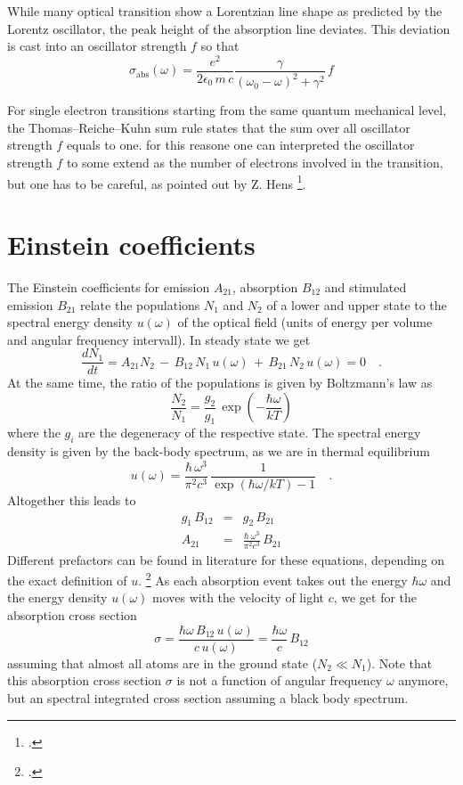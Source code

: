 While many optical transition show a Lorentzian line shape as predicted by the Lorentz oscillator, the peak height of the absorption line deviates. This deviation is cast into an oscillator strength $f$ so that 
\[
 \sigma_{\text{abs}}(\omega) =   \frac{e^2  }{2 \epsilon_0 \,  m \, c}  \frac{\gamma  }{(\omega_0 - \omega)^2 +  \gamma ^2}  \, f
\]

For single electron transitions starting from the same quantum mechanical level, the Thomas–Reiche–Kuhn sum rule states that the sum over all oscillator strength $f$ equals to one. for this reasone one can interpreted the oscillator strength  $f$  to some extend  as the number of electrons involved in  the transition, but one has to be careful, as pointed out by Z. Hens \footcite{Hens:2008kr}.

\section{Einstein coefficients}

The Einstein coefficients for emission $A_{21}$, absorption $B_{12}$ and stimulated emission $B_{21}$ relate the populations $N_1$ and $N_2$ of a lower and upper state to the spectral energy density $u(\omega)$ of the optical field (units of energy per volume and angular frequency intervall). In steady state we get
\[
 \frac{d N_1}{dt} =  A_{21} N_2 \, - \, B_{12} \, N_1 \, u(\omega) \, + \, B_{21}\, N_2 \,u(\omega)  = 0 \quad .
\]
At the same time, the ratio of the populations is given by Boltzmann's law as
\[
 \frac{N_2}{N_1} = \frac{g_2}{g_1} \, \exp \left( - \frac{\hbar \omega}{kT} \right)
\]
where the $g_i$ are the degeneracy of the respective state. The spectral energy density is given by the back-body spectrum, as we are in thermal equilibrium
\[
 u(\omega) = \frac{\hbar \, \omega^3}{\pi^2 c^3} \, \frac{1}{\exp \left( \hbar \omega / kT \right) - 1} \quad .
\]
Altogether this leads to 
\begin{eqnarray*}
 g_1 \, B_{12} &=& g_2 \, B_{21} \\
 A_{21} &=&  \frac{\hbar \, \omega^3}{\pi^2 c^3} \, B_{21} 
\end{eqnarray*}
Different prefactors can be found in literature for these equations, depending on the exact definition of $u$.
 \footcite{Hilborn:2002wj} 
 As each absorption event takes out the energy $\hbar \omega$ and the energy density $u(\omega)$ moves with the velocity of light $c$, we get for the absorption cross section
\[
 \sigma = \frac{\hbar \omega \, B_{12} \, u(\omega)  }{c \, u(\omega) }  =
   \frac{\hbar \omega  }{c  }    \, B_{12}
\]
assuming that almost all atoms are in the ground state ($N_2 \ll N_1$). Note that this absorption cross section $\sigma$ is not a function of angular frequency $\omega$ anymore, but an spectral integrated cross section assuming a black body spectrum.



